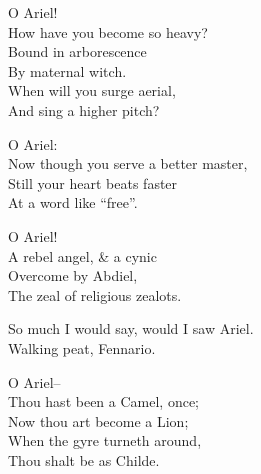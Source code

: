 
O Ariel! \\
How have you become so heavy? \\ 
Bound in arborescence \\
By maternal witch. \\
When will you surge aerial, \\
And sing a higher pitch? 

O Ariel: \\
Now though you serve a better master, \\
Still your heart beats faster \\
At a word like ``free''.

O Ariel! \\
A rebel angel, \& a cynic \\
Overcome by Abdiel, \\
The zeal of religious zealots.

So much I would say, would I saw Ariel. \\
Walking peat, Fennario. %

O Ariel-- \\
Thou hast been a Camel, once; \\
Now thou art become a Lion; \\
When the gyre turneth around, \\
Thou shalt be as Childe.